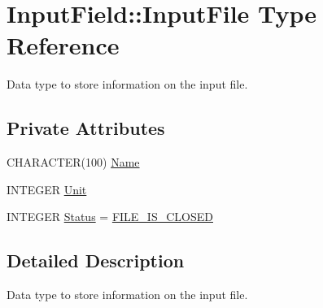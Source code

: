 \hypertarget{type_input_field_1_1_input_file}{
\section{InputField::InputFile Type Reference}
\label{type_input_field_1_1_input_file}
}


Data type to store information on the input file.  
\subsection*{Private Attributes}
\begin{DoxyCompactItemize}
\item 
CHARACTER(100) \hyperlink{type_input_field_1_1_input_file_a1731f4e55040b6630d6933f9b55ca1a3}{Name}
\item 
INTEGER \hyperlink{type_input_field_1_1_input_file_ac772de8ff66ba14e860a064f2fd7c781}{Unit}
\item 
INTEGER \hyperlink{type_input_field_1_1_input_file_af70102c64dcb62c287d0600f8ab97b85}{Status} = \hyperlink{namespace_input_field_a1408d7aae417ece86cc598019d1e5ff9}{FILE\_\-IS\_\-CLOSED}
\end{DoxyCompactItemize}


\subsection{Detailed Description}
Data type to store information on the input file. 

